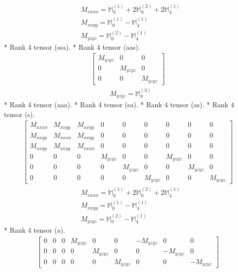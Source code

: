 \documentclass[fleqn,8pt,landscape]{jsarticle}
\begin{document}
\begin{align*}
& M_{xxxx} = \mathbb{M}_{0}^{(1)} + 2 \mathbb{M}_{0}^{(2)} + 2 \mathbb{M}_{4}^{(1)} \\
& M_{xxyy} = \mathbb{M}_{0}^{(1)} - \mathbb{M}_{4}^{(1)} \\
& M_{yzyz} = \mathbb{M}_{0}^{(2)} - \mathbb{M}_{4}^{(1)}
\end{align*}
* Rank 4 tensor (ssa).
* Rank 4 tensor (aas).
\begin{align*}
\begin{bmatrix} M_{yzyz} & 0 & 0 \\ 0 & M_{yzyz} & 0 \\ 0 & 0 & M_{yzyz} \end{bmatrix}
\end{align*}
\begin{align*}
& M_{yzyz} = \mathbb{M}_{0}^{(3)}
\end{align*}
* Rank 4 tensor (aaa).
* Rank 4 tensor (sa).
* Rank 4 tensor (as).
* Rank 4 tensor (s).
\begin{align*}
\begin{bmatrix} M_{xxxx} & M_{xxyy} & M_{xxyy} & 0 & 0 & 0 & 0 & 0 & 0 \\ M_{xxyy} & M_{xxxx} & M_{xxyy} & 0 & 0 & 0 & 0 & 0 & 0 \\ M_{xxyy} & M_{xxyy} & M_{xxxx} & 0 & 0 & 0 & 0 & 0 & 0 \\ 0 & 0 & 0 & M_{yzyz} & 0 & 0 & M_{yzyz} & 0 & 0 \\ 0 & 0 & 0 & 0 & M_{yzyz} & 0 & 0 & M_{yzyz} & 0 \\ 0 & 0 & 0 & 0 & 0 & M_{yzyz} & 0 & 0 & M_{yzyz} \end{bmatrix}
\end{align*}
\begin{align*}
& M_{xxxx} = \mathbb{M}_{0}^{(1)} + 2 \mathbb{M}_{0}^{(2)} + 2 \mathbb{M}_{4}^{(1)} \\
& M_{xxyy} = \mathbb{M}_{0}^{(1)} - \mathbb{M}_{4}^{(1)} \\
& M_{yzyz} = \mathbb{M}_{0}^{(2)} - \mathbb{M}_{4}^{(1)}
\end{align*}
* Rank 4 tensor (a).
\begin{align*}
\begin{bmatrix} 0 & 0 & 0 & M_{yzyz} & 0 & 0 & - M_{yzyz} & 0 & 0 \\ 0 & 0 & 0 & 0 & M_{yzyz} & 0 & 0 & - M_{yzyz} & 0 \\ 0 & 0 & 0 & 0 & 0 & M_{yzyz} & 0 & 0 & - M_{yzyz} \end{bmatrix}
\end{align*}
\end{document}
